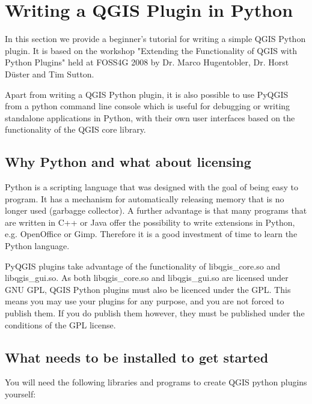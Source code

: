 
\section{Writing a QGIS Plugin in Python}


In this section we provide a beginner's tutorial for writing a simple QGIS Python
plugin. It is based on the workshop "Extending the Functionality of QGIS
with Python Plugins" held at FOSS4G 2008 by Dr. Marco Hugentobler, Dr. Horst
D\"uster and Tim Sutton. 

Apart from writing a QGIS Python plugin, it is also possible to use PyQGIS
from a python command line console which is useful for debugging or writing 
standalone applications in Python, with their own user interfaces
based on the functionality of the QGIS core library.

\subsection{Why Python and what about licensing}

Python is a scripting language that was designed with the goal of being easy
to program. It has a mechanism for automatically releasing memory that is no
longer used (garbagge collector). A further advantage is that many programs
that are written in C++ or Java offer the possibility to write extensions in
Python, e.g. OpenOffice or Gimp. Therefore it is a good investment of time to
learn the Python language.

PyQGIS plugins take advantage of the functionality of libqgis\_core.so and libqgis\_gui.so. 
As both libqgis\_core.so and libqgis\_gui.so are licensed under GNU GPL, QGIS Python 
plugins must also be licenced under the GPL. This means you may use your plugins 
for any purpose, and you are not forced to publish them. If you do publish them however, 
they must be published under the conditions of the GPL license. 

\subsection{What needs to be installed to get started}

You will need the following libraries and programs to create QGIS python plugins yourself:

